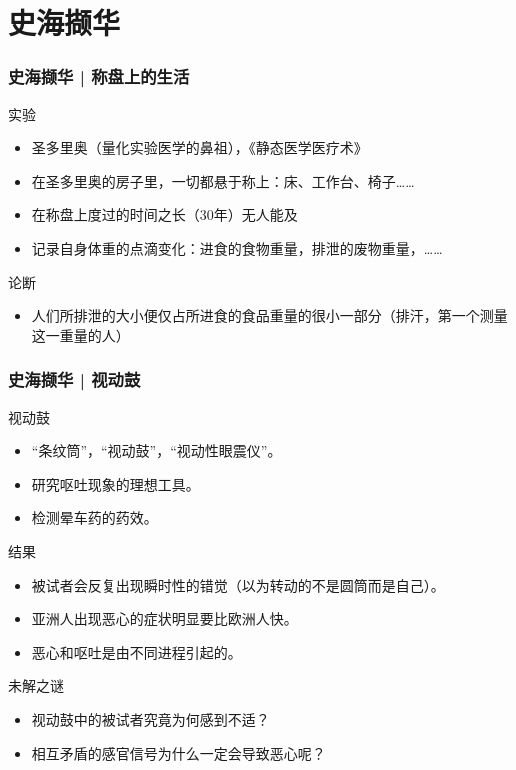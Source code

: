 \section{史海撷华}
\begin{frame}
  \frametitle{史海撷华 | 称盘上的生活}
  \begin{block}{实验}
    \begin{itemize}
      \item 圣多里奥（量化实验医学的鼻祖），《静态医学医疗术》
      \item 在圣多里奥的房子里，一切都悬于称上：床、工作台、椅子……
      \item 在称盘上度过的时间之长（30年）无人能及
      \item 记录自身体重的点滴变化：进食的食物重量，排泄的废物重量，……
    \end{itemize}
  \end{block}
  \pause
  \begin{block}{论断}
    \begin{itemize}
      \item 人们所排泄的大小便仅占所进食的食品重量的很小一部分（排汗，第一个测量这一重量的人）
    \end{itemize}
  \end{block}
\end{frame}

\begin{frame}
  \frametitle{史海撷华 | 视动鼓}
  \begin{block}{视动鼓}
    \begin{itemize}
      \item “条纹筒”，“视动鼓”，“视动性眼震仪”。
      \item 研究呕吐现象的理想工具。
      \item 检测晕车药的药效。
    \end{itemize}
  \end{block}
  \pause
  \begin{block}{结果}
    \begin{itemize}
      \item 被试者会反复出现瞬时性的错觉（以为转动的不是圆筒而是自己）。
      \item 亚洲人出现恶心的症状明显要比欧洲人快。
      \item 恶心和呕吐是由不同进程引起的。
    \end{itemize}
  \end{block}
  \pause
  \begin{block}{未解之谜}
    \begin{itemize}
      \item 视动鼓中的被试者究竟为何感到不适？
      \item 相互矛盾的感官信号为什么一定会导致恶心呢？
    \end{itemize}
  \end{block}
\end{frame}

